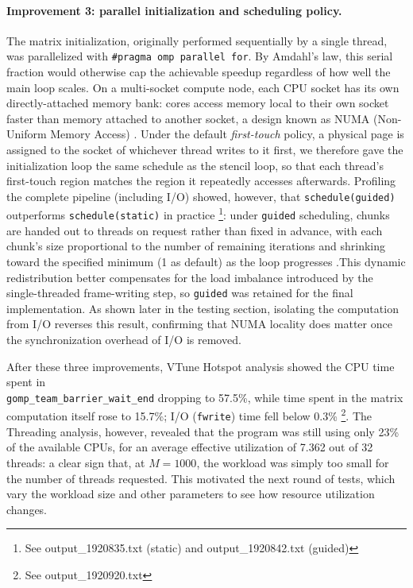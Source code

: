 \paragraph{Improvement 3: parallel initialization and scheduling policy.}
The matrix initialization, originally performed sequentially by a single
thread, was parallelized with \texttt{\#pragma omp parallel for}. By
Amdahl's law, this serial fraction would otherwise cap the achievable
speedup regardless of how well the main loop scales. On a multi-socket
compute node, each CPU socket has its own directly-attached memory
bank: cores access memory local to their own socket faster than memory
attached to another socket, a design known as NUMA (Non-Uniform Memory
Access) \cite{numaslides}. Under the default \textit{first-touch} policy, a physical page
is assigned to the socket of whichever thread writes to it first, we therefore gave
the initialization loop the same schedule as the stencil loop, so that
each thread's first-touch region matches the region it repeatedly
accesses afterwards. Profiling the complete pipeline
(including I/O) showed, however, that \texttt{schedule(guided)}
outperforms \texttt{schedule(static)} in practice \footnote{See output\_1920835.txt (static) and output\_1920842.txt (guided)}: 
under \texttt{guided} scheduling,
chunks are handed out to threads on request rather than fixed in advance,
with each chunk's size proportional to the number of remaining
iterations and shrinking toward the specified minimum (1 as default) as the loop
progresses \cite{openmpcollapse}.This dynamic redistribution better
compensates for the load imbalance introduced by the single-threaded
frame-writing step, so \texttt{guided} was retained for the final
implementation. As shown later in the testing section,
isolating the computation from I/O reverses this result, confirming that
NUMA locality does matter once the synchronization overhead of I/O is
removed.

After these three improvements, VTune Hotspot analysis showed the CPU
time spent in \\\texttt{gomp\_team\_barrier\_wait\_end} dropping to 57.5\%,
while time spent in the matrix computation itself rose to 15.7\%; I/O
(\texttt{fwrite}) time fell below 0.3\% \footnote{ See output\_1920920.txt}. The Threading analysis, however,
revealed that the program was still using only 23\% of the available
CPUs, for an average effective utilization of 7.362 out of 32 threads:
a clear sign that, at $M=1000$, the workload was simply too small for the
number of threads requested. This motivated the next round of tests,
which vary the workload size and other parameters to see how resource
utilization changes.

